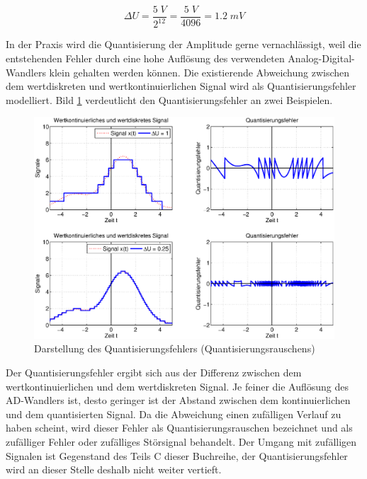 \begin{equation}\label{eq:twoone}
\Delta U=\frac{5{ \; V}}{2^{12} } =\frac{5{ \; V}}{4096} =1.2\; mV
\end{equation}


\noindent In der Praxis wird die Quantisierung der Amplitude gerne vernachlässigt, weil die entstehenden Fehler durch eine hohe Auflösung des verwendeten Analog-Digital-Wandlers klein gehalten werden können. Die existierende Abweichung zwischen dem wertdiskreten und wertkontinuierlichen Signal wird als Quantisierungsfehler modelliert. Bild \ref{fig:Quantisierungsfehler} verdeutlicht den Quantisierungsfehler an zwei Beispielen.

\clearpage

\begin{figure}[H]
  \centerline{\includegraphics[width=1\textwidth]{Kapitel1/Bilder/image1}}
  \caption{Darstellung des Quantisierungsfehlers (Quantisierungsrauschens)}
  \label{fig:Quantisierungsfehler}
\end{figure}

\noindent Der Quantisierungsfehler ergibt sich aus der Differenz zwischen dem wertkontinuierlichen und dem wertdiskreten Signal. Je feiner die Auflösung des AD-Wandlers ist, desto geringer ist der Abstand zwischen dem kontinuierlichen und dem quantisierten Signal. Da die Abweichung einen zufälligen Verlauf zu haben scheint, wird dieser Fehler als Quantisierungsrauschen bezeichnet und als zufälliger Fehler oder zufälliges Störsignal behandelt. Der Umgang mit zufälligen Signalen ist Gegenstand des Teils C dieser Buchreihe, der Quantisierungsfehler wird an dieser Stelle deshalb nicht weiter vertieft.

